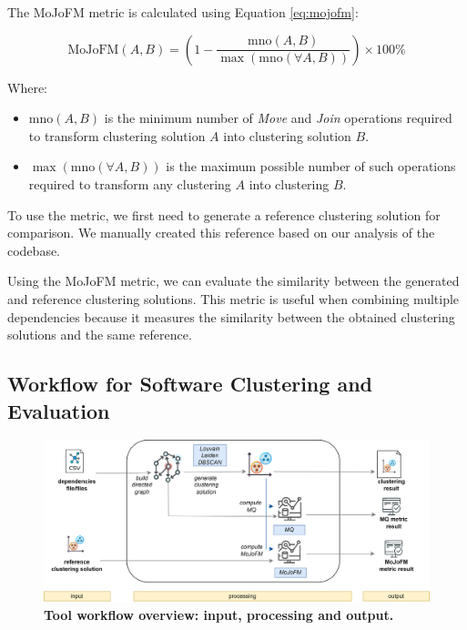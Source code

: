 \documentclass[12pt, a4paper, twoside]{report}
\begin{document}
The MoJoFM metric is calculated using Equation \eqref{eq:mojofm}:

\begin{equation}
\text{MoJoFM}(A, B) = \left(1 - \frac{\text{mno}(A, B)}{\max(\text{mno}(\forall A, B))}\right) \times 100\%
\label{eq:mojofm}
\end{equation}

Where:

\begin{itemize}
\item $\text{mno}(A, B)$ is the minimum number of \textit{Move} and \textit{Join} operations required to transform clustering solution $A$ into clustering solution $B$.
\item $\max(\text{mno}(\forall A, B))$ is the maximum possible number of such operations required to transform any clustering $A$ into clustering $B$.
\end{itemize}

To use the metric, we first need to generate a reference clustering solution for comparison. We manually created this reference based on our analysis of the codebase.

Using the MoJoFM metric, we can evaluate the similarity between the generated and reference clustering solutions. This metric is useful when combining multiple dependencies because it measures the similarity between the obtained clustering solutions and the same reference.


\subsection{Workflow for Software Clustering and Evaluation}
\label{subsec:tool_workflow}


\begin{figure}[t!]
  \centering
  \includegraphics[width=\columnwidth]{workflow-tool.png}
  \caption{ \textbf{Tool workflow overview: input, processing and output.}}
  \label{fig:tool}
\end{figure}
\end{document}
